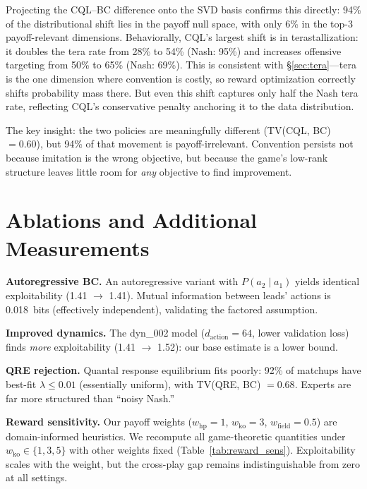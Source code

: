 \documentclass{article}
\begin{document}
Projecting the CQL--BC difference onto the SVD basis confirms this directly: 94\% of the distributional shift lies in the payoff null space, with only 6\% in the top-3 payoff-relevant dimensions. Behaviorally, CQL's largest shift is in terastallization: it doubles the tera rate from 28\% to 54\% (Nash: 95\%) and increases offensive targeting from 50\% to 65\% (Nash: 69\%). This is consistent with \S\ref{sec:tera}---tera is the one dimension where convention is costly, so reward optimization correctly shifts probability mass there. But even this shift captures only half the Nash tera rate, reflecting CQL's conservative penalty anchoring it to the data distribution.

The key insight: the two policies are meaningfully different (TV(CQL, BC) $= 0.60$), but 94\% of that movement is payoff-irrelevant. Convention persists not because imitation is the wrong objective, but because the game's low-rank structure leaves little room for \emph{any} objective to find improvement.

\section{Ablations and Additional Measurements}
\label{sec:ablations}

\textbf{Autoregressive BC.} An autoregressive variant with $P(a_2 \mid a_1)$ yields identical exploitability (1.41 $\to$ 1.41). Mutual information between leads' actions is 0.018~bits (effectively independent), validating the factored assumption.

\textbf{Improved dynamics.} The dyn\_002 model ($d_\text{action} = 64$, lower validation loss) finds \emph{more} exploitability (1.41 $\to$ 1.52): our base estimate is a lower bound.

\textbf{QRE rejection.} Quantal response equilibrium \citep{mckelvey1995quantal} fits poorly: 92\% of matchups have best-fit $\lambda \leq 0.01$ (essentially uniform), with TV(QRE, BC) $= 0.68$. Experts are far more structured than ``noisy Nash.''

\textbf{Reward sensitivity.} Our payoff weights ($w_\text{hp} = 1$, $w_\text{ko} = 3$, $w_\text{field} = 0.5$) are domain-informed heuristics. We recompute all game-theoretic quantities under $w_\text{ko} \in \{1, 3, 5\}$ with other weights fixed (Table~\ref{tab:reward_sens}). Exploitability scales with the weight, but the cross-play gap remains indistinguishable from zero at all settings.
\end{document}
